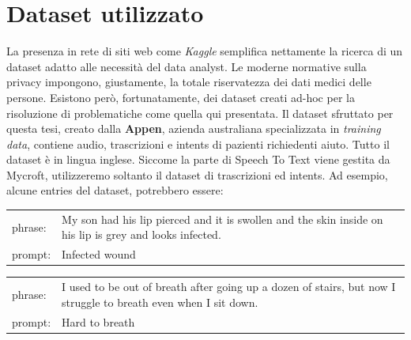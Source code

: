 \section{Dataset utilizzato}
La presenza in rete di siti web come \textit{Kaggle} semplifica nettamente la ricerca di un dataset adatto alle necessità del data analyst. Le moderne normative sulla privacy impongono, giustamente, la totale riservatezza dei dati medici delle persone. Esistono però, fortunatamente, dei dataset creati ad-hoc per la risoluzione di problematiche come quella qui presentata. Il dataset sfruttato per questa tesi\cite{dataset:medical-speech}, creato dalla \textbf{Appen}, azienda australiana specializzata in \textit{training data}, contiene audio, trascrizioni e intents di pazienti richiedenti aiuto. Tutto il dataset è in lingua inglese. Siccome la parte di Speech To Text viene gestita da Mycroft, utilizzeremo soltanto il dataset di trascrizioni ed intents. Ad esempio, alcune entries del dataset, potrebbero essere:
\begin{table}[H]
    \begin{tabularx}{\textwidth}{|l|X|}
        phrase: & My son had his lip pierced and it is swollen and the skin inside on his lip is grey and looks infected.
        \\
        prompt: & Infected wound
    \end{tabularx}
\end{table}
\begin{table}[H]
    \begin{tabularx}{\textwidth}{|l|X|}
        phrase: & I used to be out of breath after going up a dozen of stairs, but now I struggle to breath even when I sit down.
        \\
        prompt: & Hard to breath
    \end{tabularx}
\end{table}
